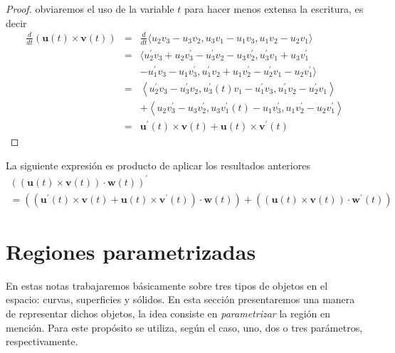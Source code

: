   \begin{proof}
    obviaremos el uso de la variable $t$ para hacer menos extensa la escritura, es decir
    \begin{eqnarray*}
      \frac{d}{dt}\left( \mathbf{u}(t)\times \mathbf{v}(t)\right) &=& \frac{d}{dt} \langle u_{2} v_{3} -u_{3} v_{2} ,u_{3} v_{1} -u_{1} v_{3} ,u_{1} v_{2} -u_{2} v_{1} \rangle \\
      &=& \big\langle u_{2}^{\prime} v_{3}+u_{2} v_{3}^{\prime} -u_{3}^{\prime} v_{2} -u_{3} v_{2}^{\prime},u_{3}^{\prime} v_{1} +u_{3}v_{1}^{\prime} \\
      && -u_{1}^{\prime}v_{3} -u_{1} v_{3}^{\prime},   u_{1}^{\prime}v_{2}+u_{1}v_{2}^{\prime}  -u_{2}^{\prime} v_{1} -u_{2} v_{1}^{\prime} \big\rangle \\
      &=& \left\langle u_{2}^{\prime} v_{3}-u_{3}^{\prime} v_{2} ,u_{3}^{\prime}(t) v_{1} -u_{1}^{\prime} v_{3},u_{1}^{\prime} v_{2} -u_{2}^{\prime} v_{1} \right\rangle  \\
      && +\left\langle u_{2} v_{3}^{\prime} -u_{3}v_{2}^{\prime} ,u_{3} v_{1}^{\prime}(t) -u_{1} v_{3}^{\prime} ,u_{1} v_{2}^{\prime} -u_{2} v_{1}^{\prime} \right\rangle \\
      &=& \mathbf{u}^{\prime}(t)\times \mathbf{v}(t)+\mathbf{u}(t)\times \mathbf{v}^{\prime}(t)
    \end{eqnarray*}
  \end{proof}
  La siguiente expresión es producto de aplicar los resultados anteriores
  \begin{gather*}
    \left( \left( \mathbf{u}(t)\times \mathbf{v}(t)\right)\cdot \mathbf{w}(t)\right)^{\prime} \\ = \left( \left( \mathbf{u}^{\prime}(t)\times \mathbf{v}(t)+\mathbf{u}(t)\times \mathbf{v}^{\prime}(t)\right) \cdot \mathbf{w}(t)\right) +\left( \left( \mathbf{u}(t)\times \mathbf{v}(t)\right)\cdot \mathbf{w}^{\prime}(t)\right)
  \end{gather*}

  \section{Regiones parametrizadas} \label{regionesparametrizadas}
  En estas notas trabajaremos básicamente sobre tres tipos de objetos en el espacio: curvas, superficies y sólidos.
  En esta sección presentaremos una manera de representar dichos objetos, la idea consiste en \emph{parametrizar} la región en mención. Para este propósito se utiliza, según el caso, uno, dos o tres parámetros, respectivamente.

